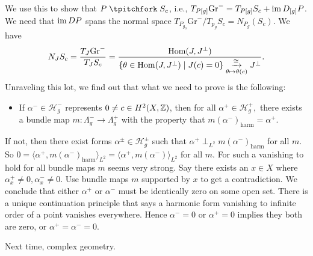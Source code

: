 We use this to show that $P\transv S_c$, i.e., $T_{P[g]}\mathrm{Gr}^- = T_{P[g]}S_c + \operatorname{im} D_{[g]}P$. We need that $\operatorname{im} DP$ spans the normal space $T_{P_{g_0}}\mathrm{Gr}^- / T_{p_g}S_c = N_{P_g}(S_c)$. We have \[
    N_J S_c = \frac{T_J \mathrm{Gr}^-}{T_J S_c} = \frac{\operatorname{Hom} (J,J^{\perp})}{\{\theta \in \operatorname{Hom}(J, J^{\perp}) \mid  J(c) = 0\} \underset{\theta \mapsto  \theta(c)}{\xrightarrow{\cong}}  J^{\perp}}.
\] Unraveling this lot, we find out that what we need to prove is the following:
\begin{itemize}
\setlength\itemsep{-.2em}
    \item If $\alpha  ^- \in \mathcal H^-_g$ represents $0\neq c \in H^2(X,\mathbb{Z})$, then for all $\alpha  ^+ \in \mathcal H^+_g,$ there exists a bundle map $m \colon \Lambda_g^- \to \Lambda_g^+$ with the property that $m(\alpha ^-) _{\mathrm{harm}} = \alpha ^+$.
\end{itemize}
If not, then there exist forms $\alpha ^{\pm}\in \mathcal H ^{\pm}_g$ such that $\alpha ^+ \perp _{L^2}m(\alpha ^-)_{\mathrm{harm}}$ for all $m$. So $0 = \langle \alpha ^+, m(\alpha ^-) _{\mathrm{harm}} \rangle _{L^2} = \langle \alpha ^+, m(\alpha ^-) \rangle _{L^2}$ for all $m$. For such a vanishing to hold for all bundle maps $m$ seems very strong. Say there exists an $x \in X$ where $\alpha _x^+ \neq 0, \alpha _x^- \neq 0$. Use bundle maps $m$ supported by $x$ to get a contradiction. We conclude that either $\alpha ^+ $ or $\alpha ^-$ must be identically zero on some open set. There is a unique continuation principle that says a harmonic form vanishing to infinite order of a point vanishes everywhere. Hence $\alpha ^- = 0$ or $\alpha ^+ =0$ implies they both are zero, or $\alpha ^+ = \alpha ^- = 0$. 

Next time, complex geometry.
